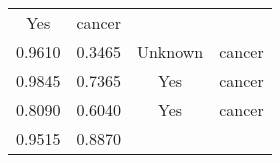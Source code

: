 \documentclass[12pt,]{article}
\begin{document}
\begin{longtable}[]{@{}cccc@{}}
\begin{minipage}[t]{0.22\columnwidth}
Yes\strut
\end{minipage} & \begin{minipage}[t]{0.16\columnwidth}\centering\strut
cancer\strut
\end{minipage}\tabularnewline
\begin{minipage}[t]{0.24\columnwidth}\centering\strut
0.9610\strut
\end{minipage} & \begin{minipage}[t]{0.26\columnwidth}\centering\strut
0.3465\strut
\end{minipage} & \begin{minipage}[t]{0.22\columnwidth}\centering\strut
Unknown\strut
\end{minipage} & \begin{minipage}[t]{0.16\columnwidth}\centering\strut
cancer\strut
\end{minipage}\tabularnewline
\begin{minipage}[t]{0.24\columnwidth}\centering\strut
0.9845\strut
\end{minipage} & \begin{minipage}[t]{0.26\columnwidth}\centering\strut
0.7365\strut
\end{minipage} & \begin{minipage}[t]{0.22\columnwidth}\centering\strut
Yes\strut
\end{minipage} & \begin{minipage}[t]{0.16\columnwidth}\centering\strut
cancer\strut
\end{minipage}\tabularnewline
\begin{minipage}[t]{0.24\columnwidth}\centering\strut
0.8090\strut
\end{minipage} & \begin{minipage}[t]{0.26\columnwidth}\centering\strut
0.6040\strut
\end{minipage} & \begin{minipage}[t]{0.22\columnwidth}\centering\strut
Yes\strut
\end{minipage} & \begin{minipage}[t]{0.16\columnwidth}\centering\strut
cancer\strut
\end{minipage}\tabularnewline
\begin{minipage}[t]{0.24\columnwidth}\centering\strut
0.9515\strut
\end{minipage} & \begin{minipage}[t]{0.26\columnwidth}\centering\strut
0.8870\strut
\end{minipage} & \begin{minipage}[t]{0.22\columnwidth}\centering\strut

\end{minipage}
\end{longtable}
\end{document}
